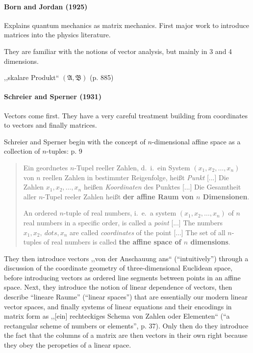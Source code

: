\paragraph{Born and Jordan (1925)~\cite{Born1925}}

Explains quantum mechanics as matrix mechanics. First major work to introduce matrices into the physics literature.

They are familiar with the notions of vector analysis, but mainly in 3 and 4 dimensions.

,,skalare Produkt`` $(\mathfrak A, \mathfrak B)$ (p. 885)



\paragraph{Schreier and Sperner (1931)~\cite{Schreier1931}}

Vectors come first. They have a very careful treatment building from coordinates
to vectors and finally matrices.

Schreier and Sperner begin with the concept of $n$-dimensional affine space
as a collection of $n$-tuples: p. 9

\begin{quote}
    Ein geordnetes $n$-Tupel reeller Zahlen, d.\ i.\ ein System $(x_1, x_2, \dots, x_n)$
    von $n$ reellen Zahlen in bestimmter Reigenfolge, heißt \textit{Punkt} [...]
    Die Zahlen $x_1, x_2, \dots, x_n$ heißen \textit{Koordinaten} des Punktes [...]
    Die Gesamtheit aller $n$-Tupel reeler Zahlen heißt \textbf{der affine
    Raum von $n$ Dimensionen}.

    An ordered $n$-tuple of real numbers, i.\ e.\ a system $(x_1, x_2, \dots, x_n)$ of
    $n$ real numbers in a specific order, is called a \textit{point} [...]
    The numbers $ x_1, x_2, \ dots, x_n$ are called \textit{coordinates} of the point [...]
    The set of all $n$-tuples of real numbers is called \textbf{the affine
    space of $n$ dimensions}.
\end{quote}

They then introduce vectors ,,von der Anschauung ans`` (``intuitively'') through a discussion of
the coordinate geometry of three-dimensional Euclidean space, before introducing
vectors as ordered line segments between points in an affine space. Next, they
introduce the notion of linear dependence of vectors, then describe ``lineare
Raume'' (``linear spaces'') that are essentially our modern linear vector spaces,
and finally systems of linear equations and their encodings in matrix form as
,,[ein] rechteckiges Schema von Zahlen oder Elementen`` (``a rectangular scheme
of numbers or elements'', p. 37).
Only then do they introduce the fact that the columns of a matrix are then vectors
in their own right because they obey the peropeties of a linear space.

